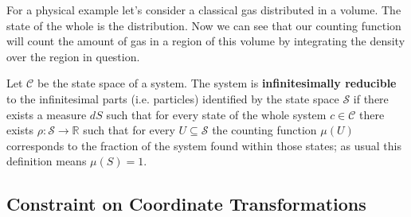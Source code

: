 \documentclass{article}[a4paper]
\begin{document}
	 For a physical example let's consider a classical gas distributed in a volume. The state of the whole is the distribution. Now we can see that our counting function will count the amount of gas in a region of this volume by integrating the density over the region in question.
	
	
\begin{defn}
	Let $\mathcal{C}$ be the state space of a system. The system is \textbf{infinitesimally reducible} to the infinitesimal parts (i.e. particles) identified by the state space $\mathcal{S}$ if there exists a measure $dS$ such that for every state of the whole system $c \in \mathcal{C}$ there exists $\rho : \mathcal{S} \to \mathbb{R}$ such that for every $U \subseteq \mathcal{S}$ the counting function $\mu(U)$ corresponds to the fraction of the system found within those states; as usual this definition means $\mu(S) = 1$.
\end{defn}	
	
\subsection{Constraint on Coordinate Transformations}	

\end{document}
